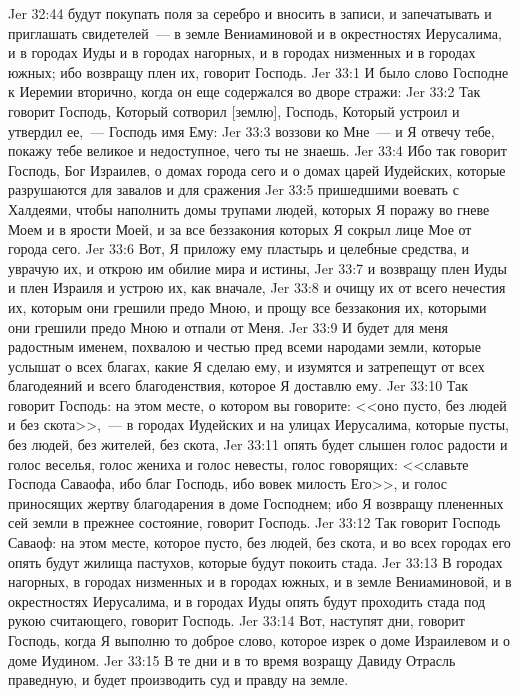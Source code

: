 \vs Jer 32:44 будут покупать поля за серебро и вносить в записи, и запечатывать и приглашать свидетелей~--- в земле Вениаминовой и в окрестностях Иерусалима, и в городах Иуды и в городах нагорных, и в городах низменных и в городах южных; ибо возвращу плен их, говорит Господь.
\vs Jer 33:1 И было слово Господне к Иеремии вторично, когда он еще содержался во дворе стражи:
\vs Jer 33:2 Так говорит Господь, Который сотворил [землю], Господь, Который устроил и утвердил ее,~--- Господь имя Ему:
\vs Jer 33:3 воззови ко Мне~--- и Я отвечу тебе, покажу тебе великое и недоступное, чего ты не знаешь.
\vs Jer 33:4 Ибо так говорит Господь, Бог Израилев, о домах города сего и о домах царей Иудейских, которые разрушаются для завалов и для сражения
\vs Jer 33:5 пришедшими воевать с Халдеями, чтобы наполнить домы трупами людей, которых Я поражу во гневе Моем и в ярости Моей, и за все беззакония которых Я сокрыл лице Мое от города сего.
\vs Jer 33:6 Вот, Я приложу ему пластырь и целебные средства, и уврачую их, и открою им обилие мира и истины,
\vs Jer 33:7 и возвращу плен Иуды и плен Израиля и устрою их, как вначале,
\vs Jer 33:8 и очищу их от всего нечестия их, которым они грешили предо Мною, и прощу все беззакония их, которыми они грешили предо Мною и отпали от Меня.
\vs Jer 33:9 И будет для меня  радостным именем, похвалою и честью пред всеми народами земли, которые услышат о всех благах, какие Я сделаю ему, и изумятся и затрепещут от всех благодеяний и всего благоденствия, которое Я доставлю ему.
\rsbpar\vs Jer 33:10 Так говорит Господь: на этом месте, о котором вы говорите: <<оно пусто, без людей и без скота>>,~--- в городах Иудейских и на улицах Иерусалима, которые пусты, без людей, без жителей, без скота,
\vs Jer 33:11 опять будет слышен голос радости и голос веселья, голос жениха и голос невесты, голос говорящих: <<славьте Господа Саваофа, ибо благ Господь, ибо вовек милость Его>>, и голос приносящих жертву благодарения в доме Господнем; ибо Я возвращу плененных сей земли в прежнее состояние, говорит Господь.
\vs Jer 33:12 Так говорит Господь Саваоф: на этом месте, которое пусто, без людей, без скота, и во всех городах его опять будут жилища пастухов, которые будут покоить стада.
\vs Jer 33:13 В городах нагорных, в городах низменных и в городах южных, и в земле Вениаминовой, и в окрестностях Иерусалима, и в городах Иуды опять будут проходить стада под рукою считающего, говорит Господь.
\vs Jer 33:14 Вот, наступят дни, говорит Господь, когда Я выполню то доброе слово, которое изрек о доме Израилевом и о доме Иудином.
\vs Jer 33:15 В те дни и в то время возращу Давиду Отрасль праведную, и будет производить суд и правду на земле.
